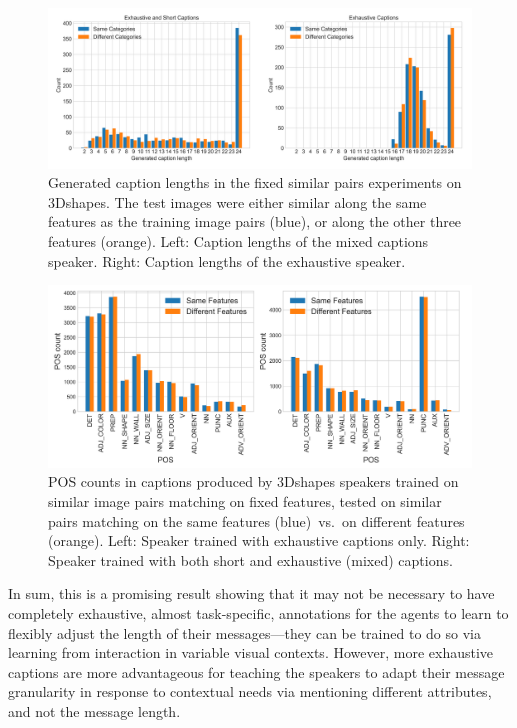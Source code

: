 \begin{figure}[h]
	\centering
	\includegraphics[width=\linewidth]{images/3dshapes_exh_short_similar_sameTest_diffTest_length_counts.png}
	\caption{Generated caption lengths in the fixed similar pairs experiments on 3Dshapes. The test images were either similar along the same features as the training image pairs (blue), or along the other three features (orange). Left: Caption lengths of the mixed captions speaker. Right: Caption lengths of the exhaustive speaker.}
	\label{fig:3dshapes_exh_short_same_diff_lengths}
\end{figure}

\begin{figure}[h]
	\centering
	\includegraphics[width=\linewidth]{images/3dshapes_similarFixedPairs_exh_vs_short_sameTest_vs_diffTest_POS_counts.png}
	\caption{POS counts in captions produced by 3Dshapes speakers trained on similar image pairs matching on fixed features, tested on similar pairs matching on the same features (blue)~vs.~on different features (orange). Left: Speaker trained with exhaustive captions only. Right: Speaker trained with both short and exhaustive (mixed) captions.}
	\label{fig:3dshapes_exh_short_same_diff_POS}
\end{figure}

In sum, this is a promising result showing that it may not be necessary to have completely exhaustive, almost task-specific, annotations for the agents to learn to flexibly adjust the length of their messages---they can be trained to do so via learning from interaction in variable visual contexts. However, more exhaustive captions are more advantageous for teaching the speakers to adapt their message granularity in response to contextual needs via mentioning different attributes, and not the message length.

